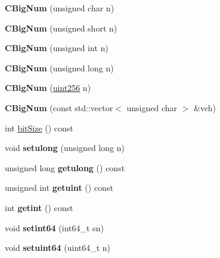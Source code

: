 \begin{DoxyCompactItemize}
{\bfseries C\+Big\+Num} (unsigned char n)
\item 
\mbox{\label{class_c_big_num_a3745ad1eb1bd53c9535f8620515d3ae3}} 
{\bfseries C\+Big\+Num} (unsigned short n)
\item 
\mbox{\label{class_c_big_num_a87ff912ff941f4bc4ba10482c502757d}} 
{\bfseries C\+Big\+Num} (unsigned int n)
\item 
\mbox{\label{class_c_big_num_ab10a8c87dd0e8ca79f67df75ca7e7ecc}} 
{\bfseries C\+Big\+Num} (unsigned long n)
\item 
\mbox{\label{class_c_big_num_a47684495c159d6279490151ae4497332}} 
{\bfseries C\+Big\+Num} (\mbox{\hyperlink{classuint256}{uint256}} n)
\item 
\mbox{\label{class_c_big_num_ad3c2843e6755a612b8734eb6e0f03ced}} 
{\bfseries C\+Big\+Num} (const std\+::vector$<$ unsigned char $>$ \&vch)
\item 
int \mbox{\hyperlink{class_c_big_num_ab4b035b81263dcba7b996997ecdcea8d}{bit\+Size}} () const
\item 
\mbox{\label{class_c_big_num_ac8c00c696d9cbd3fa309a2d0a6bc4b1d}} 
void {\bfseries setulong} (unsigned long n)
\item 
\mbox{\label{class_c_big_num_a035dfd4984c0dfb5400e83afa11e0d21}} 
unsigned long {\bfseries getulong} () const
\item 
\mbox{\label{class_c_big_num_a50e032d16c3d6a4c7a12e21b55ef8ae5}} 
unsigned int {\bfseries getuint} () const
\item 
\mbox{\label{class_c_big_num_afc4744c69da2e73b6e6a8941abf6d244}} 
int {\bfseries getint} () const
\item 
\mbox{\label{class_c_big_num_aca73fa36a797c91b30515ae61cc5d765}} 
void {\bfseries setint64} (int64\+\_\+t sn)
\item 
\mbox{\label{class_c_big_num_ae61a86bfe3b286a2cfda45ffba1c1310}} 
void {\bfseries setuint64} (uint64\+\_\+t n)

\end{DoxyCompactItemize}
